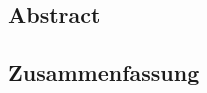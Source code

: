 \makeatletter

\begin{centering}
\textbf{\Large\@title} \\
\vspace{.1cm}
\@author \\
\end{centering}

\makeatother

\vfill
 
{\let\raggedsection\centering
\begin{centering}
\section*{Abstract}
\blindtext
\end{centering}
\vfill
\begin{german}
\section*{Zusammenfassung}
\begin{centering}
	\blindtext
\end{centering}
\end{german}}
\vfill
\blankpage